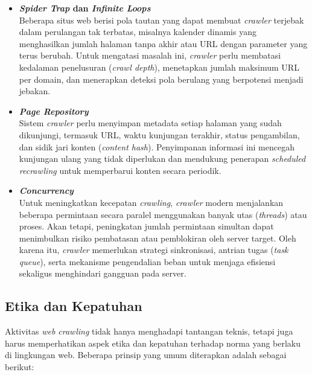 \begin{itemize}
    \item \textbf{\textit{Spider Trap} dan \textit{Infinite Loops}} \\
    Beberapa situs web berisi pola tautan yang dapat membuat \textit{crawler} terjebak dalam perulangan tak terbatas, misalnya kalender dinamis yang menghasilkan jumlah halaman tanpa akhir atau URL dengan parameter yang terus berubah. Untuk mengatasi masalah ini, \textit{crawler} perlu membatasi kedalaman penelusuran (\textit{crawl depth}), menetapkan jumlah maksimum URL per domain, dan menerapkan deteksi pola berulang yang berpotensi menjadi jebakan.

    \item \textbf{\textit{Page Repository}} \\
    Sistem \textit{crawler} perlu menyimpan metadata setiap halaman yang sudah dikunjungi, termasuk URL, waktu kunjungan terakhir, status pengambilan, dan sidik jari konten (\textit{content hash}). Penyimpanan informasi ini mencegah kunjungan ulang yang tidak diperlukan dan mendukung penerapan \textit{scheduled recrawling} untuk memperbarui konten secara periodik.

    \item \textbf{\textit{Concurrency}} \\
    Untuk meningkatkan kecepatan \textit{crawling}, \textit{crawler} modern menjalankan beberapa permintaan secara paralel menggunakan banyak utas (\textit{threads}) atau proses. Akan tetapi, peningkatan jumlah permintaan simultan dapat menimbulkan risiko pembatasan atau pemblokiran oleh server target. Oleh karena itu, \textit{crawler} memerlukan strategi sinkronisasi, antrian tugas (\textit{task queue}), serta mekanisme pengendalian beban untuk menjaga efisiensi sekaligus menghindari gangguan pada server.
\end{itemize}


\subsection{Etika dan Kepatuhan}
\label{subsec:0204-etika-crawling}

Aktivitas \textit{web crawling} tidak hanya menghadapi tantangan teknis, tetapi juga harus memperhatikan aspek etika dan kepatuhan terhadap norma yang berlaku di lingkungan web. Beberapa prinsip yang umum diterapkan adalah sebagai berikut:

